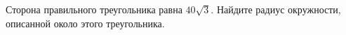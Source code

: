 \begin{ex}
	\begin{condition}
		Сторона правильного треугольника равна \( 40\sqrt{3}\). Найдите радиус окружности, описанной около этого треугольника.
	\end{condition}
\end{ex}